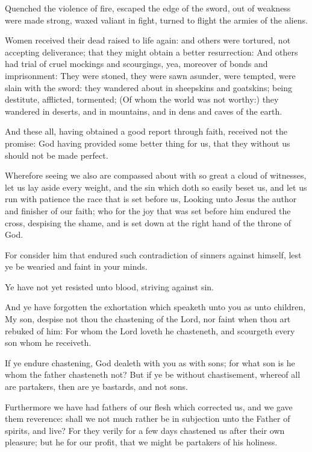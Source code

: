 \Verse Quenched the violence of fire, escaped the edge of the sword, out of weakness were made strong, waxed valiant in fight, turned to flight the armies of the aliens.

\Verse Women received their dead raised to life again: and others were tortured, not accepting deliverance; that they might obtain a better resurrection: \Verse And others had trial of cruel mockings and scourgings, yea, moreover of bonds and imprisonment: \Verse They were stoned, they were sawn asunder, were tempted, were slain with the sword: they wandered about in sheepskins and goatskins; being destitute, afflicted, tormented; \Verse (Of whom the world was not worthy:) they wandered in deserts, and in mountains, and in dens and caves of the earth.

\Verse And these all, having obtained a good report through faith, received not the promise: \Verse God having provided some better thing for us, that they without us should not be made perfect.


\Chapter
\Verse Wherefore seeing we also are compassed about with so great a cloud of witnesses, let us lay aside every weight, and the sin which doth so easily beset us, and let us run with patience the race that is set before us, \Verse Looking unto Jesus the author and finisher of our faith; who for the joy that was set before him endured the cross, despising the shame, and is set down at the right hand of the throne of God.

\Verse For consider him that endured such contradiction of sinners against himself, lest ye be wearied and faint in your minds.

\Verse Ye have not yet resisted unto blood, striving against sin.

\Verse And ye have forgotten the exhortation which speaketh unto you as unto children, My son, despise not thou the chastening of the Lord, nor faint when thou art rebuked of him: \Verse For whom the Lord loveth he chasteneth, and scourgeth every son whom he receiveth.

\Verse If ye endure chastening, God dealeth with you as with sons; for what son is he whom the father chasteneth not?  \Verse But if ye be without chastisement, whereof all are partakers, then are ye bastards, and not sons.

\Verse Furthermore we have had fathers of our flesh which corrected us, and we gave them reverence: shall we not much rather be in subjection unto the Father of spirits, and live?  \Verse For they verily for a few days chastened us after their own pleasure; but he for our profit, that we might be partakers of his holiness.

